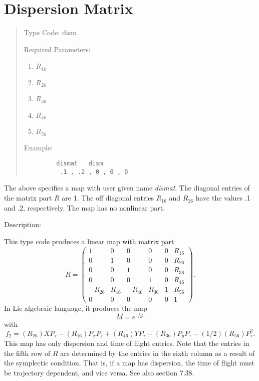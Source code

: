 \section{Dispersion Matrix}
\begin{quotation}
\noindent Type Code:  dism
\vspace{5mm}

\noindent Required Parameters:
\begin{enumerate}
      \item  $R_{16}$
      \item  $R_{26}$
      \item  $R_{36}$
      \item  $R_{46}$
      \item  $R_{56}$
\end{enumerate}

\vspace{5mm}
\noindent Example:
\begin{verbatim}
         dismat   dism
          .1 , .2 , 0 , 0 , 0
\end{verbatim}
\end{quotation}
The above specifies a map with user given name {\em dismat}.  The diagonal entries of the matrix part $R$ are 1.  The off diagonal entries $R_{16}$ and $R_{26}$ have the values .1 and .2, respectively.  The map has no nonlinear part.

\vspace{5mm}
     Description:
\vspace{2mm}

     This type code produces a linear map with matrix part
\begin{equation}
R=\left( \begin{array}{cccccc}
1 & 0 & 0 & 0 & 0 & R_{16} \\
0 & 1 & 0 & 0 & 0 & R_{26} \\
0 & 0 & 1 & 0 & 0 & R_{36} \\
0 & 0 & 0 & 1 & 0 & R_{46} \\
-R_{26} & R_{16} & -R_{46} & R_{36} & 1 & R_{56} \\
0 & 0 & 0 & 0 & 0 & 1
\end{array}
\right).
\end{equation}
In Lie algebraic language, it produces the map
\[M=e^{:f_2:}\]
with
\[f_2 = (R_{26}) X P_\tau - (R_{16}) P_x P_\tau + (R_{46}) Y P_\tau -
(R_{36}) P_y P_\tau -(1/2)(R_{56}) P_\tau^2.\]
This map has only dispersion and time of flight entries.  Note that the
entries in the fifth row of $R$ are determined by the entries in the
sixth column as a result of the symplectic condition.  That is, if a map
has dispersion, the time of flight must be trajectory dependent, and vice
versa.  See also section 7.38.

